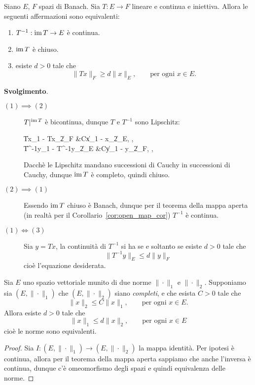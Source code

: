 \begin{exercise}
	Siano $E$, $F$ spazi di Banach. Sia $T:E \to F$ lineare e continua e iniettiva.
	Allora le seguenti affermazioni sono equivalenti:
	\begin{enumerate}
		\item $T^{-1} : \operatorname{im} T \to E$ è continua.
		\item $\operatorname{im} T$ è chiuso.
		\item esiste $d > 0$ tale che
		\begin{equation*}
			\|Tx\|_F \geq d\|x\|_E, \qquad \text{per ogni $x \in E$.}
		\end{equation*}
	\end{enumerate}

	\noindent\textbf{Svolgimento}.
	\begin{description}
		\item[$(1) \implies (2)$] $T\vert^{\operatorname{im} T}$ è bicontinua, dunque $T$ e $T^{-1}$ sono Lipschitz:
		\begin{eqalign*}
			\|Tx_1 - Tx_2\|_F &\leq C\|x_1 - x_2\|_E, \qquad {},\\
			\|T^{-1}y_1 - T^{-1}y_2\|_E &\leq C\|y_1 - y_2\|_F, \qquad {},\\
		\end{eqalign*}
		Dacchè le Lipschitz mandano successioni di Cauchy in successioni di Cauchy, dunque $\operatorname{im} T$ è completo, quindi chiuso.
		\item[$(2) \implies (1)$] Essendo $\operatorname{im} T$ chiuso è Banach, dunque per il teorema della mappa aperta (in realtà per il Corollario~\ref{cor:open_map_cor}) $T^{-1}$ è continua.
		\item[$(1) \iff (3)$] Sia $y=Tx$, la continuità di $T^{-1}$ si ha se e soltanto se esiste $d > 0$ tale che
		\begin{equation*}
			\|T^{-1}y\|_E \leq d\|y\|_F
		\end{equation*}
		cioè l'equazione desiderata.
	\end{description}
\end{exercise}

\begin{corollary}
\label{cor:equiv_norm}
	Sia $E$ uno spazio vettoriale munito di due norme $\|\cdot\|_1$ e $\|\cdot\|_2$. Supponiamo sia $(E, \|\cdot\|_1)$ che $(E, \|\cdot\|_2)$ siano \emph{completi}, e che esista $C > 0$ tale che
	\begin{equation*}
		\|x\|_2 \leq C\|x\|_1, \qquad \text{per ogni $x \in E$}.
	\end{equation*}
	Allora esiste $d > 0$ tale che
	\begin{equation*}
		\|x\|_1 \leq d \|x\|_2, \qquad \text{per ogni $x \in E$}
	\end{equation*}
	cioè le norme sono equivalenti.
\end{corollary}
\begin{proof}
	Sia $I : (E, \|\cdot\|_1) \to (E, \|\cdot\|_2)$ la mappa identità. Per ipotesi è continua, allora per il teorema della mappa aperta sappiamo che anche l'inversa è continua, dunque c'è omeomorfismo degli spazi e quindi equivalenza delle norme.
\end{proof}

